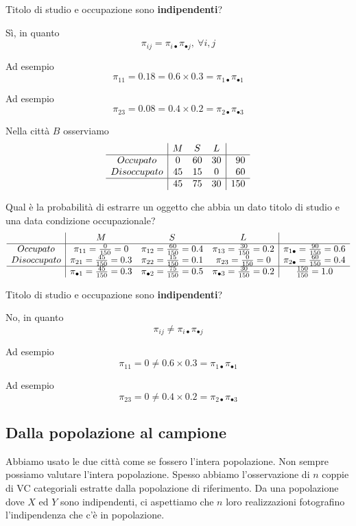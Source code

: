 \documentclass[
  11pt,
]{book}
\theoremstyle{mytheoremstyle}
\theoremstyle{mydefstyle}
\begin{document}
Titolo di studio e occupazione sono \textbf{indipendenti}?

Sì, in quanto
\[\pi_{ij}=\pi_{i\bullet}\pi_{\bullet j},~\forall i,j\]

Ad esempio
\[\pi_{11}=0.18=0.6\times0.3=\pi_{1\bullet}\pi_{\bullet 1}\]

Ad esempio
\[\pi_{23}=0.08=0.4\times0.2=\pi_{2\bullet}\pi_{\bullet 3}\]

Nella città \(B\) osserviamo
\[
\begin{array}{c|ccc|r}
         &M &S &L  & \\   \hline
Occupato    & 0     & 60     & 30     & 90\\
Disoccupato & 45     & 15     & 0     & 60\\ \hline
         & 45 & 75 & 30 & 150
\end{array}
\]

Qual è la probabilità di estrarre un oggetto che abbia un dato titolo di studio e una data condizione occupazionale?
\[
\begin{array}{c|ccc|c}
         &M &S &L  & \\   \hline
Occupato    & \pi_{11}=\frac {0}{150}=0    
         & \pi_{12}=\frac{60}{150}=0.4    
         & \pi_{13}=\frac{30}{150}=0.2 
         & \pi_{1\bullet}=\frac{90}{150}=0.6\\
Disoccupato & \pi_{21}=\frac {45}{150}=0.3    
         & \pi_{22}=\frac{15}{150}=0.1    
         & \pi_{23}=\frac{0}{150}=0 
         & \pi_{2\bullet}=\frac{60}{150}=0.4\\ \hline
         & \pi_{\bullet1}=\frac{45}{150}=0.3    
         & \pi_{\bullet2}=\frac{75}{150}=0.5 
         & \pi_{\bullet3}=\frac{30}{150}=0.2
         & \frac {150}{150}=1.0
\end{array}
\]

Titolo di studio e occupazione sono \textbf{indipendenti}?

No, in quanto
\[\pi_{ij}\neq\pi_{i\bullet}\pi_{\bullet j}\]

Ad esempio
\[\pi_{11}=0\neq0.6\times0.3=\pi_{1\bullet}\pi_{\bullet 1}\]

Ad esempio
\[\pi_{23}=0\neq0.4\times0.2=\pi_{2\bullet}\pi_{\bullet 3}\]

\subsection{Dalla popolazione al campione}\label{dalla-popolazione-al-campione}

Abbiamo usato le due città come se fossero l'intera popolazione.
Non sempre possiamo valutare l'intera popolazione.
Spesso abbiamo l'osservazione di \(n\) coppie di VC categoriali estratte dalla
popolazione di riferimento.
Da una popolazione dove \(X\) ed \(Y\) sono indipendenti, ci aspettiamo che \(n\)
loro realizzazioni fotografino l'indipendenza che c'è in popolazione.
\end{document}
